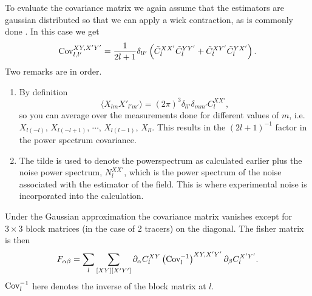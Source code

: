 \documentclass[11pt]{article} %
\DeclareRobustCommand{\Cov}{\ifmmode\text{Cov}\else d\fi}
\newcommand{\br}[1]{\ensuremath{\left( #1 \right)}}
\begin{document}
To evaluate the covariance matrix we again assume that the estimators are gaussian distributed so that we can apply a wick contraction, as is commonly done \cite{tegmark1997cosmic}. In this case we get
\begin{equation*}
    \Cov^{XY, X'Y'}_{l, l'} = \frac{1}{2l+1}\delta_{ll'}\br{\tilde C^{XX'}_l \tilde C^{YY'}_l + \tilde C^{XY'}_l \tilde C^{YX'}_l}.
\end{equation*}
Two remarks are in order.
\begin{enumerate}
    \item By definition
    \begin{equation*}
        \langle X_{lm}X'_{l'm'} \rangle = (2\pi)^3 \delta_{ll'}\delta_{mm'}C_l^{XX'},
    \end{equation*}
    so you can average over the measurements done for different values of $m$, i.e. $X_{l(-l)}$, $X_{l(-l+1)}$, $\cdots$, $X_{l(l-1)}$, $X_{ll}$. This results in the $(2l+1)^{-1}$ factor in the power spectrum covariance. 
    \item The tilde is used to denote the powerspectrum as calculated earlier plus the noise power spectrum, $N^{XX'}_l$, which is the power spectrum of the noise associated with the estimator of the field. This is where experimental noise is incorporated into the calculation. 
\end{enumerate}
Under the Gaussian approximation the covariance matrix vanishes except for $3\times 3$ block matrices (in the case of 2 tracers) on the diagonal. The fisher matrix is then
\begin{equation*}
    F_{\alpha\beta} = \sum_{l}\sum_{[XY][X'Y']} \partial_\alpha C_{l}^{XY} \br{\Cov^{-1}_l}^{XY, X'Y'} \partial_\beta C^{X'Y'}_{l}.
\end{equation*} 
$\Cov^{-1}_l$ here denotes the inverse of the block matrix at $l$.
\end{document}
